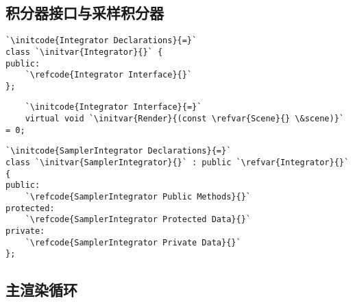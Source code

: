 \subsection{积分器接口与采样积分器}\label{sub:积分器接口与采样积分器}

\begin{lstlisting}
`\initcode{Integrator Declarations}{=}`
class `\initvar{Integrator}{}` {
public:
    `\refcode{Integrator Interface}{}`
};
\end{lstlisting}

\begin{lstlisting}
    `\initcode{Integrator Interface}{=}`
    virtual void `\initvar{Render}{(const \refvar{Scene}{} \&scene)}` = 0;
\end{lstlisting}

\begin{lstlisting}
`\initcode{SamplerIntegrator Declarations}{=}`
class `\initvar{SamplerIntegrator}{}` : public `\refvar{Integrator}{}` {
public:
    `\refcode{SamplerIntegrator Public Methods}{}`
protected:
    `\refcode{SamplerIntegrator Protected Data}{}`
private:
    `\refcode{SamplerIntegrator Private Data}{}`
};
\end{lstlisting}


\subsection{主渲染循环}\label{sub:主渲染循环}